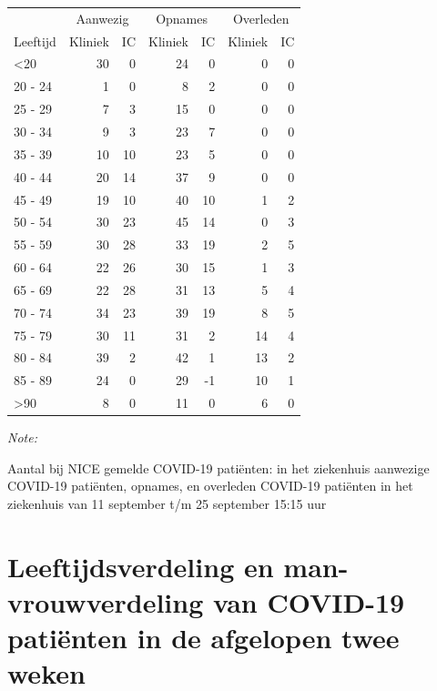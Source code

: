 \documentclass[
  english,
  man,floatsintext]{apa6}
\begin{document}
\begin{table}
\centering\begingroup\fontsize{10}{12}\selectfont

\begin{threeparttable}
\begin{tabular}{lrrrrrr}
\toprule
\multicolumn{1}{c}{ } & \multicolumn{2}{c}{Aanwezig} & \multicolumn{2}{c}{Opnames} & \multicolumn{2}{c}{Overleden} \\
\cmidrule(l{3pt}r{3pt}){2-3} \cmidrule(l{3pt}r{3pt}){4-5} \cmidrule(l{3pt}r{3pt}){6-7}
Leeftijd & Kliniek & IC & Kliniek & IC & Kliniek & IC\\
\midrule
<20 & 30 & 0 & 24 & 0 & 0 & 0\\
20 - 24 & 1 & 0 & 8 & 2 & 0 & 0\\
25 - 29 & 7 & 3 & 15 & 0 & 0 & 0\\
30 - 34 & 9 & 3 & 23 & 7 & 0 & 0\\
35 - 39 & 10 & 10 & 23 & 5 & 0 & 0\\
40 - 44 & 20 & 14 & 37 & 9 & 0 & 0\\
45 - 49 & 19 & 10 & 40 & 10 & 1 & 2\\
50 - 54 & 30 & 23 & 45 & 14 & 0 & 3\\
55 - 59 & 30 & 28 & 33 & 19 & 2 & 5\\
60 - 64 & 22 & 26 & 30 & 15 & 1 & 3\\
65 - 69 & 22 & 28 & 31 & 13 & 5 & 4\\
70 - 74 & 34 & 23 & 39 & 19 & 8 & 5\\
75 - 79 & 30 & 11 & 31 & 2 & 14 & 4\\
80 - 84 & 39 & 2 & 42 & 1 & 13 & 2\\
85 - 89 & 24 & 0 & 29 & -1 & 10 & 1\\
>90 & 8 & 0 & 11 & 0 & 6 & 0\\
\bottomrule
\end{tabular}
\begin{tablenotes}
\item \textit{Note: } 
\item Aantal bij NICE gemelde COVID-19 patiënten: in het ziekenhuis aanwezige COVID-19 patiënten, opnames, en overleden COVID-19 patiënten in het ziekenhuis van 11 september t/m 25 september 15:15 uur
\end{tablenotes}
\end{threeparttable}
\endgroup{}
\end{table}

\newpage

\hypertarget{leeftijdsverdeling-en-man-vrouwverdeling-van-covid-19-patiuxebnten-in-de-afgelopen-twee-weken}{%
\section{Leeftijdsverdeling en man-vrouwverdeling van COVID-19 patiënten in de afgelopen twee weken}\label{leeftijdsverdeling-en-man-vrouwverdeling-van-covid-19-patiuxebnten-in-de-afgelopen-twee-weken}}
\end{document}
